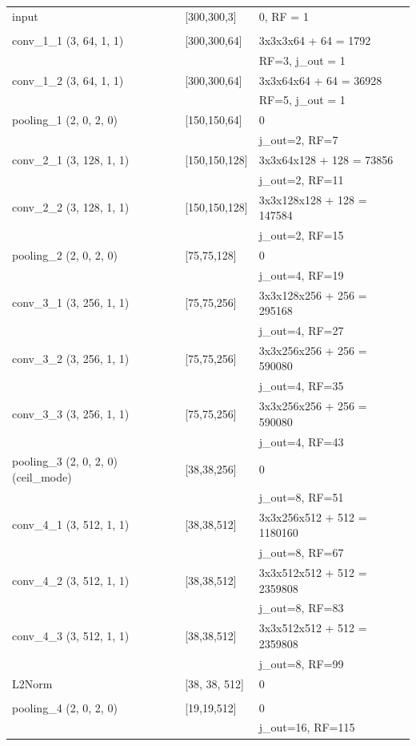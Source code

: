\documentclass[a4paper]{report}
\begin{document}
\begin{table}[h]
\begin{tabular}{|l|l|l|}
		input & [300,300,3] & 0, RF = 1 \\
		& & \\ \hline
		conv\_1\_1 (3, 64, 1, 1) & [300,300,64] & 3x3x3x64 + 64 = 1792\\  
		& & RF=3, j\_out = 1 \\ \hline
		conv\_1\_2 (3, 64, 1, 1) & [300,300,64] & 3x3x64x64 + 64 = 36928 \\
		& & RF=5, j\_out = 1 \\ \hline
		pooling\_1 (2, 0, 2, 0) & [150,150,64] & 0 \\
		&&j\_out=2, RF=7 \\ \hline
		conv\_2\_1 (3, 128, 1, 1) & [150,150,128] & 3x3x64x128 + 128 = 73856\\
		&&j\_out=2, RF=11 \\ \hline
		conv\_2\_2 (3, 128, 1, 1) & [150,150,128] & 3x3x128x128 + 128 = 147584\\
		&&j\_out=2, RF=15 \\ \hline
		pooling\_2 (2, 0, 2, 0) & [75,75,128] & 0\\
		&&j\_out=4, RF=19 \\ \hline
		conv\_3\_1 (3, 256, 1, 1) & [75,75,256] & 3x3x128x256 + 256 = 295168\\
		&&j\_out=4, RF=27 \\ \hline
		conv\_3\_2 (3, 256, 1, 1) & [75,75,256] & 3x3x256x256 + 256 = 590080\\
		&&j\_out=4, RF=35 \\ \hline
		conv\_3\_3 (3, 256, 1, 1) & [75,75,256] & 3x3x256x256 + 256 = 590080\\
		&&j\_out=4, RF=43 \\ \hline
		pooling\_3 (2, 0, 2, 0) (ceil\_mode) & [38,38,256] & 0\\
		&&j\_out=8, RF=51 \\ \hline
		conv\_4\_1 (3, 512, 1, 1) & [38,38,512] & 3x3x256x512 + 512 = 1180160\\
		&&j\_out=8, RF=67 \\ \hline
		conv\_4\_2 (3, 512, 1, 1) & [38,38,512] & 3x3x512x512 + 512 = 2359808\\
		&&j\_out=8, RF=83 \\ \hline
		conv\_4\_3 (3, 512, 1, 1) & [38,38,512] & 3x3x512x512 + 512 = 2359808\\
		&& j\_out=8, RF=99 \\ \hline
		L2Norm & [38, 38, 512] & 0 \\ 
		& & \\ \hline
		pooling\_4 (2, 0, 2, 0) & [19,19,512] &0\\
		&&j\_out=16, RF=115 \\ \hline

\end{tabular}
\end{table}
\end{document}
